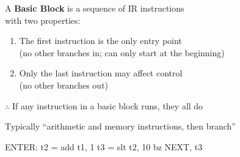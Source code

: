 \documentclass{plt}
\begin{document}
\begin{frame}[fragile,t]

  A \textbf{Basic Block} is a sequence of IR instructions \\
  with two properties:

\begin{enumerate}
\item The first instruction is the only entry point \\ (no other branches
  in; can only start at the beginning)
\item Only the last instruction may affect control \\ (no other branches out)
\end{enumerate}

$\therefore$ If any instruction in a basic block runs, they all do

Typically ``arithmetic and memory instructions, then branch''

\begin{center}
\begin{llvm}
ENTER:   t2 = add t1, 1
         t3 = slt t2, 10
         bz NEXT, t3
\end{llvm}
\end{center}

\end{frame}

\def\split{\uncover<2->{\hrule}}
\def\lead{\uncover<1->{\hfill\rlap{\hspace{4pt}\textcolor{red}{$\blacktriangleleft$}}}}
\end{document}
